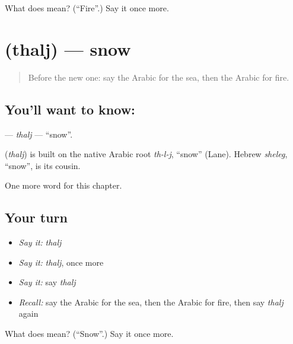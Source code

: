 \begin{tcolorbox}[breakable,colback=teal!4,colframe=teal!35!black,title={Before you move on}]
What does  mean? (\textquotedblleft{}Fire\textquotedblright{}.) Say it once more.
\end{tcolorbox}
\section[\texorpdfstring{\ar{ثلج} (thalj)}{ثلج (thalj)}]{ (thalj) — snow}

\label{lesson:AR-C78-thalj}



\begin{quote}
Before the new one: say the Arabic for the sea, then the Arabic for fire.
\end{quote}

\subsection*{You'll want to know: }
\textbf{} — \emph{thalj} — \textquotedblleft{}snow\textquotedblright{}.

\begin{cousinweb}
\textbf{} (\emph{thalj}) is built on the native Arabic root \emph{th-l-j}, \textquotedblleft{}snow\textquotedblright{} (Lane). Hebrew \emph{sheleg}, \textquotedblleft{}snow\textquotedblright{}, is its cousin.
\end{cousinweb}

\begin{grammarlens}[title={What you've built}]
One more word for this chapter.
\end{grammarlens}

\subsection*{Your turn}
\begin{itemize}
\raggedright
  \item \emph{Say it:} \emph{thalj}
  \item \emph{Say it:} \emph{thalj}, once more
  \item \emph{Say it:} say \emph{thalj}
  \item \emph{Recall:} say the Arabic for the sea, then the Arabic for fire, then say \emph{thalj} again
\end{itemize}

\begin{tcolorbox}[breakable,colback=teal!4,colframe=teal!35!black,title={Before you move on}]
What does  mean? (\textquotedblleft{}Snow\textquotedblright{}.) Say it once more.
\end{tcolorbox}
